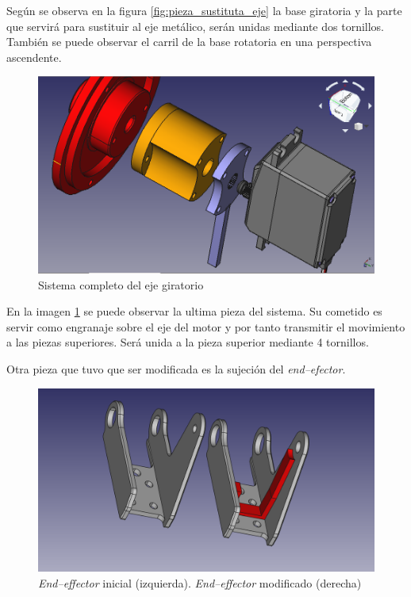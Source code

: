Según se observa en la figura \ref{fig:pieza_sustituta_eje} la base giratoria y la parte que servirá para sustituir al eje metálico, serán unidas mediante dos tornillos.
También se puede observar el carril de la base rotatoria en una perspectiva ascendente.

\begin{figure}[H]
    \centering
    \includegraphics[width=.9\linewidth]{pictures/CadenaCineticaDelEje.png}
    \caption{Sistema completo del eje giratorio}
    \label{fig:sistema_completo_eje}
\end{figure}

En la imagen \ref{fig:sistema_completo_eje} se puede observar la ultima pieza del sistema. Su cometido es servir como engranaje sobre el eje del motor y por tanto transmitir el movimiento a las piezas superiores.
Será unida a la pieza superior mediante 4 tornillos.

Otra pieza que tuvo que ser modificada es la sujeción del \textit{end--efector}.

\begin{figure}[H]
    \centering
    \includegraphics[width=.9\linewidth]{pictures/EndEffectorModificado.png}
    \caption{\textit{End--effector} inicial (izquierda). \textit{End--effector} modificado (derecha)}
    \label{fig:end_effector_modificado}
\end{figure}

